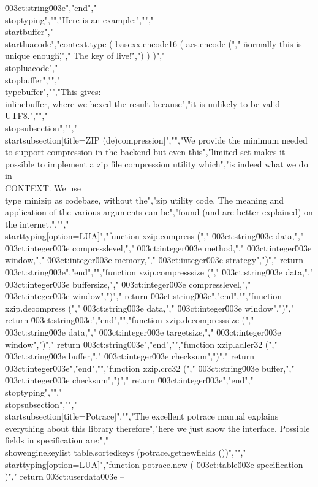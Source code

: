 \u003ct:string\u003e","end","\\stoptyping","","Here is an example:","","\\startbuffer","\\startluacode","context.type ( basexx.encode16 ( aes.encode (","    \"normally this is unique enough\",","    \"The key of live!\"",") ) )","\\stopluacode","\\stopbuffer","","\\typebuffer","","This gives: \\inlinebuffer, where we hexed the result because","it is unlikely to be valid \\UTF8.","","\\stopsubsection","","\\startsubsection[title=ZIP (de)compression]","","We provide the minimum needed to support compression in the backend but even this","limited set makes it possible to implement a zip file compression utility which","is indeed what we do in \\CONTEXT. We use \\type {minizip} as codebase, without the","zip utility code. The meaning and application of the various arguments can be","found (and are better explained) on the internet.","","\\starttyping[option=LUA]","function xzip.compress (","    \u003ct:string\u003e  data,","    \u003ct:integer\u003e compresslevel,","    \u003ct:integer\u003e method,","    \u003ct:integer\u003e window,","    \u003ct:integer\u003e memory,","    \u003ct:integer\u003e strategy",")","    return \u003ct:string\u003e","end","","function xzip.compresssize (","    \u003ct:string\u003e  data,","    \u003ct:integer\u003e buffersize,","    \u003ct:integer\u003e compresslevel,","    \u003ct:integer\u003e window",")","    return \u003ct:string\u003e","end","","function xzip.decompress (","    \u003ct:string\u003e  data,","    \u003ct:integer\u003e window",")","    return \u003ct:string\u003e","end","","function xzip.decompresssize (","    \u003ct:string\u003e  data,","    \u003ct:integer\u003e targetsize,","    \u003ct:integer\u003e window",")","    return \u003ct:string\u003e","end","","function xzip.adler32 (","    \u003ct:string\u003e  buffer,","    \u003ct:integer\u003e checksum",")","    return \u003ct:integer\u003e","end","","function xzip.crc32 (","    \u003ct:string\u003e  buffer,","    \u003ct:integer\u003e checksum",")","    return \u003ct:integer\u003e","end","\\stoptyping","","\\stopsubsection","","\\startsubsection[title=Potrace]","","The excellent potrace manual explains everything about this library therefore","here we just show the interface. Possible fields in specification are:","\\showenginekeylist {table.sortedkeys (potrace.getnewfields ())}","","\\starttyping[option=LUA]","function potrace.new ( \u003ct:table\u003e specification )","    return \u003ct:userdata\u003e -- 
